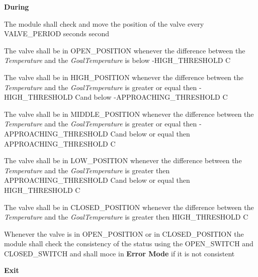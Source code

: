 \begin{req_enum}
\begin{req_enum}[label*=\arabic*.]
\begin{req_enum}[label*=\arabic*.]
							\item \textbf{During}
								\begin{req_enum}[label*=\arabic*.]
									\item The module shall check and move the position of the valve every VALVE\_PERIOD seconds  second
									\item The valve shall be in OPEN\_POSITION whenever the difference between the \textit{Temperature} and the \textit{GoalTemperature} is below -HIGH\_THRESHOLD C\degree
									\item The valve shall be in HIGH\_POSITION whenever the difference between the \textit{Temperature} and the \textit{GoalTemperature} is greater or equal then -HIGH\_THRESHOLD C\degree and below -APPROACHING\_THRESHOLD C\degree
									\item The valve shall be in MIDDLE\_POSITION whenever the difference between the \textit{Temperature} and the \textit{GoalTemperature} is greater or equal then -APPROACHING\_THRESHOLD C\degree and below or equal then APPROACHING\_THRESHOLD C\degree
									\item The valve shall be in LOW\_POSITION whenever the difference between the \textit{Temperature} and the \textit{GoalTemperature} is greater then APPROACHING\_THRESHOLD C\degree and below or equal then HIGH\_THRESHOLD C\degree
									\item The valve shall be in CLOSED\_POSITION whenever the difference between the \textit{Temperature} and the \textit{GoalTemperature} is greater then HIGH\_THRESHOLD C\degree
									\item Whenever the valve is in OPEN\_POSITION or in CLOSED\_POSITION the module shall check the consistency of the status using the OPEN\_SWITCH and CLOSED\_SWITCH and shall moce in \textbf{Error Mode} if it is not consistent
								\end{req_enum}

							\item \textbf{Exit}
						\end{req_enum}


\end{req_enum}
\end{req_enum}
